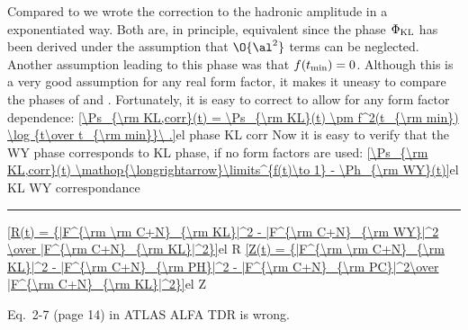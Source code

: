 Compared to  we wrote the correction to the hadronic amplitude in a exponentiated way. Both are, in principle, equivalent since the phase $\Phi_{\rm KL}$ has been derived under the assumption that $\O{\al^2}$ terms can be neglected. Another assumption leading to this phase was that $f(t_{\rm min}) = 0$. Although this is a very good assumption for any real form factor, it makes it uneasy to compare the phases of \KL{} and \WY. Fortunately, it is easy to correct  to allow for any form factor dependence:
\eqref{\Ps_{\rm KL,corr}(t) = \Ps_{\rm KL}(t) \pm f^2(t_{\rm min}) \log {t\over t_{\rm min}}\ .}{el phase KL corr}
Now it is easy to verify that the WY phase corresponds to KL phase, if no form factors are used:
\eqref{\Ps_{\rm KL,corr}(t) \mathop{\longrightarrow}\limits^{f(t)\to 1} - \Ph_{\rm WY}(t)}{el KL WY correspondance}


\vskip1cm
\hrule

\eqref{R(t) = {|F^{\rm \rm C+N}_{\rm KL}|^2 - |F^{\rm C+N}_{\rm WY}|^2 \over |F^{\rm C+N}_{\rm KL}|^2}}{el R}
\eqref{Z(t) = {|F^{\rm \rm C+N}_{\rm KL}|^2 - |F^{\rm C+N}_{\rm PH}|^2 - |F^{\rm C+N}_{\rm PC}|^2\over |F^{\rm C+N}_{\rm KL}|^2}}{el Z}



Eq.~2-7 (page 14) in ATLAS ALFA TDR  is wrong.
\fi


